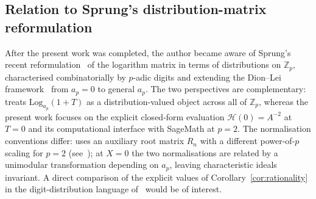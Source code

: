 \documentclass[11pt,a4paper]{amsart}
\theoremstyle{definition}
\newcommand{\Z}{\mathbb{Z}}
\newcommand{\Hcal}{\mathcal{H}}
\begin{document}
\subsection{Relation to Sprung's distribution-matrix reformulation}\label{subsec:sprung2022}
After the present work was completed, the author became aware of Sprung's recent reformulation~\cite{Sprung2022} of the logarithm matrix in terms of distributions on $\Z_p$, characterised combinatorially by $p$-adic digits and extending the Dion--Lei framework~\cite{DionLei2017} from $a_p = 0$ to general $a_p$. The two perspectives are complementary: \cite{Sprung2022} treats $\mathrm{Log}_{a_p}(1+T)$ as a distribution-valued object across all of $\Z_p$, whereas the present work focuses on the explicit closed-form evaluation $\Hcal(0) = A^{-2}$ at $T = 0$ and its computational interface with SageMath at $p = 2$. The normalisation conventions differ: \cite{Sprung2022} uses an auxiliary root matrix $R_n$ with a different power-of-$p$ scaling for $p = 2$ (see~\cite[footnote~1]{Sprung2022}); at $X = 0$ the two normalisations are related by a unimodular transformation depending on $a_p$, leaving characteristic ideals invariant. A direct comparison of the explicit values of Corollary~\ref{cor:rationality} in the digit-distribution language of~\cite{Sprung2022} would be of interest.
\end{document}
